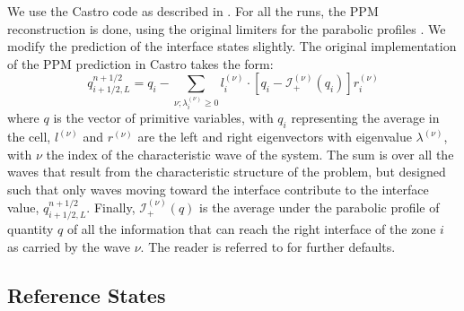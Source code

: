 \documentclass[12pt,preprint]{aastex}
\begin{document}
We use the Castro code as described in \citet{castro}.  For all the
runs, the PPM reconstruction is done, using the original limiters for
the parabolic profiles \citep{ppm}.  We modify the prediction of the
interface states slightly.  The original implementation of the PPM
prediction in Castro takes the form:
\begin{equation}
q_{i+1/2,L}^{n+1/2} = q_i -
   \sum_{\nu;\lambda_i^{(\nu)}\ge 0} l_i^{(\nu)} \cdot \left [
        q_i - \mathcal{I}_+^{(\nu)}(q_i)
       \right ] r_i^{(\nu)}
\end{equation}
where $q$ is the vector of primitive variables, with $q_i$
representing the average in the cell, $l^{(\nu)}$ and $r^{(\nu)}$ are
the left and right eigenvectors with eigenvalue $\lambda^{(\nu)}$,
with $\nu$ the index of the characteristic wave of the system.  The
sum is over all the waves that result from the characteristic
structure of the problem, but designed such that only waves moving
toward the interface contribute to the interface value,
$q_{i+1/2,L}^{n+1/2}$.  Finally, $\mathcal{I}_+^{(\nu)}(q)$ is the
average under the parabolic profile of quantity $q$ of all the information
that can reach the right interface of the zone $i$ as carried by the wave
$\nu$.   The reader is referred to
\citet{ppmunsplit} for further defaults.

\subsection{Reference States}
\end{document}
